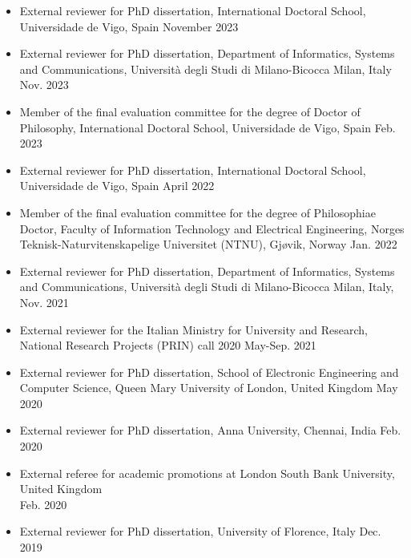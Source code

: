 \documentclass[11pt]{article}
\begin{document}
\begin{itemize}
    \item External reviewer for PhD dissertation, International Doctoral School, Universidade de Vigo, Spain \hfill November 2023
		
    \item External reviewer for PhD dissertation, Department of Informatics, Systems and Communications, Università degli Studi di Milano-Bicocca Milan, Italy \hfill Nov. 2023
		
		\item Member of the final evaluation committee for the degree of Doctor of Philosophy, International Doctoral School, Universidade de Vigo, Spain \hfill Feb. 2023
		
    \item External reviewer for PhD dissertation, International Doctoral School, Universidade de Vigo, Spain \hfill April 2022
		
    \item Member of the final evaluation committee for the degree of Philosophiae Doctor, Faculty of Information Technology and Electrical Engineering, Norges Teknisk-Naturvitenskapelige Universitet (NTNU), Gjøvik, Norway \hfill Jan. 2022
		
    \item External reviewer for PhD dissertation, Department of Informatics, Systems and Communications, Università degli Studi di Milano-Bicocca Milan, Italy, \hfill Nov. 2021
		
    \item External reviewer for the Italian Ministry for University and Research, National Research Projects (PRIN) call 2020 \hfill May-Sep. 2021
		
    \item External reviewer for PhD dissertation, School of Electronic Engineering and Computer Science, Queen Mary University of London, United Kingdom \hfill May 2020
		
    \item External reviewer for PhD dissertation, Anna University, Chennai, India \hfill Feb. 2020
		
    \item External referee for academic promotions at London South Bank University, United Kingdom \\ \mbox{} \hfill Feb. 2020
		
    \item External reviewer for PhD dissertation, University of Florence, Italy \hfill Dec. 2019
		

\end{itemize}
\end{document}
